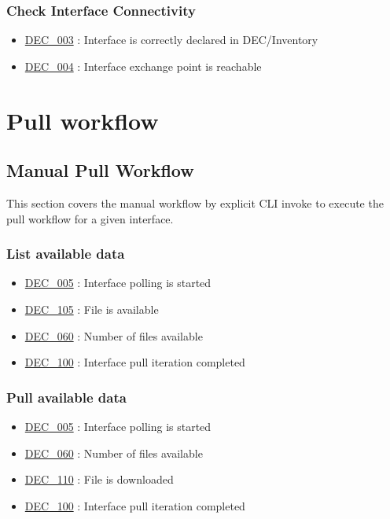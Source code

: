\documentclass[dec_sum_main.tex]{subfiles}
\begin{document}
\subsubsection{Check Interface Connectivity}
\noindent
\begin{itemize}
    \item \hyperref[DEC003]{DEC\_003} : Interface is correctly declared in DEC/Inventory
    \item \hyperref[DEC004]{DEC\_004} : Interface exchange point is reachable
\end{itemize}

\section{Pull workflow}

\subsection{Manual Pull Workflow}
This section covers the manual workflow by explicit CLI invoke to execute the pull workflow for a given interface.

\subsubsection{List available data}
\begin{itemize}
    \item \hyperref[DEC005]{DEC\_005} : Interface polling is started
    \item \hyperref[DEC105]{DEC\_105} : File is available
    \item \hyperref[DEC060]{DEC\_060} : Number of files available
    \item \hyperref[DEC100]{DEC\_100} : Interface pull iteration completed
\end{itemize}

\subsubsection{Pull available data}
 \newline
\begin{itemize}
    \item \hyperref[DEC005]{DEC\_005} : Interface polling is started
    \item \hyperref[DEC060]{DEC\_060} : Number of files available
     \item \hyperref[DEC110]{DEC\_110} : File is downloaded
    \item \hyperref[DEC100]{DEC\_100} : Interface pull iteration completed
\end{itemize}
\end{document}
